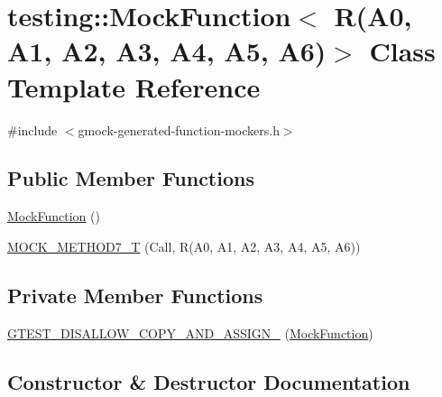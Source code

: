 \hypertarget{classtesting_1_1_mock_function_3_01_r_07_a0_00_01_a1_00_01_a2_00_01_a3_00_01_a4_00_01_a5_00_01_a6_08_4}{}\section{testing\+::Mock\+Function$<$ R(A0, A1, A2, A3, A4, A5, A6)$>$ Class Template Reference}
\label{classtesting_1_1_mock_function_3_01_r_07_a0_00_01_a1_00_01_a2_00_01_a3_00_01_a4_00_01_a5_00_01_a6_08_4}


{\ttfamily \#include $<$gmock-\/generated-\/function-\/mockers.\+h$>$}

\subsection*{Public Member Functions}
\begin{DoxyCompactItemize}
\item 
\mbox{\hyperlink{classtesting_1_1_mock_function_3_01_r_07_a0_00_01_a1_00_01_a2_00_01_a3_00_01_a4_00_01_a5_00_01_a6_08_4_a6d91c54d0d03b96fd08a852fb40a57d8}{Mock\+Function}} ()
\item 
\mbox{\hyperlink{classtesting_1_1_mock_function_3_01_r_07_a0_00_01_a1_00_01_a2_00_01_a3_00_01_a4_00_01_a5_00_01_a6_08_4_a965d96b3e212c5bd0391302fcee943d6}{M\+O\+C\+K\+\_\+\+M\+E\+T\+H\+O\+D7\+\_\+T}} (Call, R(A0, A1, A2, A3, A4, A5, A6))
\end{DoxyCompactItemize}
\subsection*{Private Member Functions}
\begin{DoxyCompactItemize}
\item 
\mbox{\hyperlink{classtesting_1_1_mock_function_3_01_r_07_a0_00_01_a1_00_01_a2_00_01_a3_00_01_a4_00_01_a5_00_01_a6_08_4_a31b17e7a2efc41a249baafa04d76884a}{G\+T\+E\+S\+T\+\_\+\+D\+I\+S\+A\+L\+L\+O\+W\+\_\+\+C\+O\+P\+Y\+\_\+\+A\+N\+D\+\_\+\+A\+S\+S\+I\+G\+N\+\_\+}} (\mbox{\hyperlink{classtesting_1_1_mock_function}{Mock\+Function}})
\end{DoxyCompactItemize}


\subsection{Constructor \& Destructor Documentation}
\mbox{\label{classtesting_1_1_mock_function_3_01_r_07_a0_00_01_a1_00_01_a2_00_01_a3_00_01_a4_00_01_a5_00_01_a6_08_4_a6d91c54d0d03b96fd08a852fb40a57d8}} 
